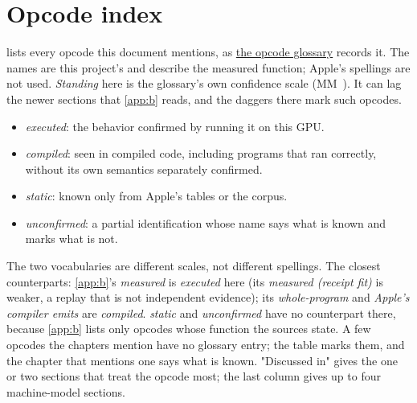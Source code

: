 \chapter{Opcode index}\label{app:c}

 lists every opcode this document mentions, as \href{https://github.com/sbryngelson/AGXForge/blob/main/isa/g17-opcode-glossary.json}{the opcode glossary} records it. The names are
this project's and describe the measured function; Apple's spellings are not used. \emph{Standing} here is the
glossary's own confidence scale (MM~). It can lag the newer sections that \cref{app:b} reads, and the daggers
there mark such opcodes.
\begin{itemize}
\item \emph{executed}: the behavior confirmed by running it on this GPU.
\item \emph{compiled}: seen in compiled code, including programs that ran correctly, without its own semantics
  separately confirmed.
\item \emph{static}: known only from Apple's tables or the corpus.
\item \emph{unconfirmed}: a partial identification whose name says what is known and marks what is not.
\end{itemize}
The two vocabularies are different scales, not different spellings. The closest counterparts: \cref{app:b}'s
\emph{measured} is \emph{executed} here (its \emph{measured (receipt fit)} is weaker, a replay that is not independent
evidence); its \emph{whole-program} and \emph{Apple's compiler emits} are \emph{compiled}. \emph{static} and \emph{unconfirmed} have no counterpart there, because \cref{app:b} lists only
opcodes whose function the sources state.
A few opcodes the chapters mention have no glossary entry; the table marks them, and the chapter that mentions one says what is known.
"Discussed in" gives the one or two sections that treat the opcode most; the last column gives up to four machine-model sections.


